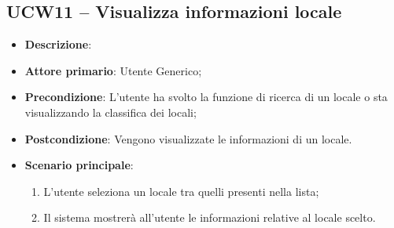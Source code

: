 \subsection{UCW11 – Visualizza informazioni locale}
\begin{center}
\end{center}
\begin{itemize}
    \item \textbf{Descrizione}:
    \item \textbf{Attore primario}: Utente Generico;
    \item \textbf{Precondizione}: L'utente ha svolto la funzione di ricerca di un locale o sta visualizzando la classifica dei locali;
    \item \textbf{Postcondizione}: Vengono visualizzate le informazioni di un locale.    
    \item \textbf{Scenario principale}: 
    \begin{enumerate}
    \item L'utente seleziona un locale tra quelli presenti nella lista;
    \item Il sistema mostrerà all'utente le informazioni relative al locale scelto.
    \end{enumerate}
\end{itemize}
